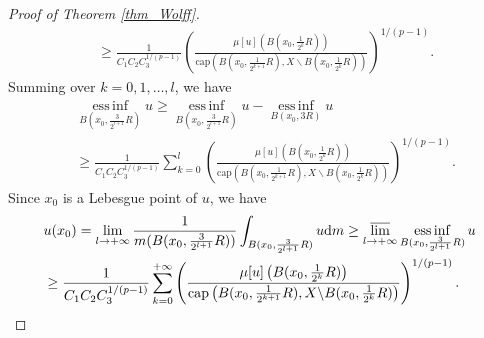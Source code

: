 \documentclass[11pt,a4paper]{article}
\numberwithin{equation}{section}
\newcommand{\einf}{\operatorname*{ess\,inf}}
\theoremstyle{plain}
\theoremstyle{definition}
\begin{document}
\begin{proof}[Proof of Theorem \ref{thm_Wolff}]
\begin{align*}
&\ge\frac{1}{C_1C_2C_3^{1/(p-1)}}\left(\frac{\mu[u]\left(B(x_0,\frac{1}{2^{k}}R)\right)}{\mathrm{cap}\left(B(x_0,\frac{1}{2^{k+1}}R),X\backslash B(x_0,\frac{1}{2^{k}}R)\right)}\right)^{1/(p-1)}.
\end{align*}
Summing over $k=0,1,\ldots,l$, we have
\begin{align*}
&\einf_{B(x_0,\frac{3}{2^{l+1}}R)}u\ge \einf_{B(x_0,\frac{3}{2^{l+1}}R)}u-\einf_{B(x_0,{3}R)}u\\
&\ge\frac{1}{C_1C_2C_3^{1/(p-1)}}\sum_{k=0}^l\left(\frac{\mu[u]\left(B(x_0,\frac{1}{2^{k}}R)\right)}{\mathrm{cap}\left(B(x_0,\frac{1}{2^{k+1}}R),X\backslash B(x_0,\frac{1}{2^{k}}R)\right)}\right)^{1/(p-1)}.
\end{align*}
Since $x_0$ is a Lebesgue point of $u$, we have
\begin{align*}
&u(x_0)=\lim_{l\to+\infty}\frac{1}{m({B(x_0,\frac{3}{2^{l+1}}R)})}\int_{{B(x_0,\frac{3}{2^{l+1}}R)}}u\mathrm{d} m\ge\varlimsup_{l\to+\infty}\einf_{B(x_0,\frac{3}{2^{l+1}}R)}u\\
&\ge\frac{1}{C_1C_2C_3^{1/(p-1)}}\sum_{k=0}^{+\infty}\left(\frac{\mu[u]\left(B(x_0,\frac{1}{2^{k}}R)\right)}{\mathrm{cap}\left(B(x_0,\frac{1}{2^{k+1}}R),X\backslash B(x_0,\frac{1}{2^{k}}R)\right)}\right)^{1/(p-1)}.
\end{align*}


\end{proof}
\end{document}
